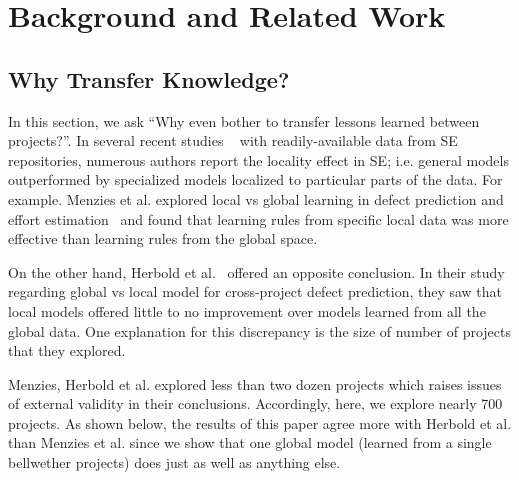 \documentclass[10pt,journal,compsoc]{IEEEtran}
\newcommand{\respto}[1]{
\fcolorbox{black}{black!15}{%
\label{resp:#1}%
\bf\scriptsize R{#1}}}
\begin{document}



\section{Background and Related Work}
\label{sec:literature}
\subsection{Why Transfer Knowledge?}
\label{sec:related}

In this section, we ask ``Why even bother to transfer lessons learned between projects?''. In several recent studies ~\cite{bettenburg2012think, menzies2012local, posnett2011ecological} with readily-available data from SE repositories, numerous authors report the locality effect in SE; i.e. general models outperformed by specialized models localized to particular parts of the data.
For example.
Menzies et al. explored local vs global learning in defect prediction and effort estimation~\cite{menzies2012local}  and found that
 learning rules from specific local data was more
 effective than learning rules from the global space.
 
 
On the other hand,
Herbold et al.~\cite{herbold2017global}  offered an opposite conclusion.
In their   study regarding global vs local model for cross-project defect prediction,
they saw that  local models offered little to no improvement over models learned
from all the global data.
One explanation for this discrepancy  is the size of number of projects that they explored.
\respto{2-14}Menzies, Herbold et al. explored less than two dozen projects which raises issues of external validity in their conclusions. Accordingly, here,  we explore nearly 700 projects. As shown below, the results of this paper agree  more with Herbold et al. than  Menzies et al. since we show that one global model (learned from a single bellwether projects) does just as well as anything else.
\end{document}
